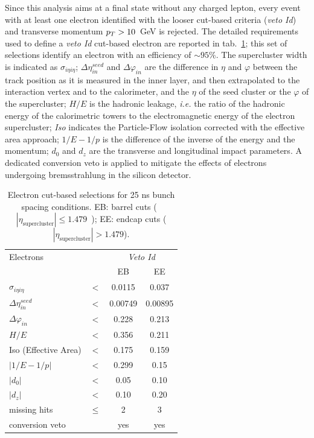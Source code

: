 \noindent Since this analysis aims at a final state without any charged lepton, every event with at least one electron identified with the looser cut-based criteria (\emph{veto Id}) and transverse momentum $p_T > 10$~GeV is rejected. The detailed requirements used to define a \emph{veto Id} cut-based electron are reported in tab.~\ref{tab:EGcutBar}; this set of selections identify an electron with an efficiency of $\sim 95$\%. The supercluster width is indicated as $\sigma_{i\eta i\eta}$; $\Delta \eta_{in}^{seed}$ and $\Delta \varphi_{in}$ are the difference in $\eta$ and $\varphi$ between the track position as it is measured in the inner layer, and then extrapolated to the interaction vertex and to the calorimeter, and the $\eta$ of the seed cluster or the $\varphi$ of the supercluster; $H/E$ is the hadronic leakage, \textit{i.e.} the ratio of the hadronic energy of the calorimetric towers to the electromagnetic energy of the electron supercluster; \emph{Iso} indicates the Particle-Flow isolation corrected with the effective area approach; $1/E - 1/p$ is the difference of the inverse of the energy and the momentum; $d_0$ and $d_z$ are the transverse and longitudinal impact parameters. A dedicated conversion veto is applied to mitigate the effects of electrons undergoing bremsstrahlung in the silicon detector.

\begin{table}[htb]
 \centering
\caption{Electron cut-based selections for 25 ns bunch spacing conditions. EB: barrel cuts (~$|\eta_\text{supercluster}| \leq 1.479$~); EE: endcap cuts ( $|\eta_\text{supercluster}| > 1.479$).}
    \begin{tabular}{l|ccc}
    Electrons                   &        & \multicolumn{2}{c}{\emph{Veto Id}}\\
                                &        & EB      & EE     \\
 \hline
 \hline
    $\sigma_{i\eta i\eta} $     & $ < $  &0.0115   &0.037  \\
    $\Delta \eta_{in}^{seed}$   & $ < $  &0.00749  &0.00895 \\
    $\Delta \varphi_{in} $      & $ < $  &0.228    &0.213   \\
    $H/E $                      & $ < $  &0.356    &0.211   \\
    Iso (Effective Area)                 & $<$    &0.175    &0.159   \\
    $|1/E - 1/p|$               & $ < $  &0.299    &0.15    \\
    $|d_0|$                     & $ < $  &0.05     &0.10   \\
    $|d_z|$                     & $ < $  &0.10     &0.20   \\
    missing hits                & $\leq$ &2        &3       \\
    conversion veto             &        &  yes    &yes     \\
    
\end{tabular}

\label{tab:EGcutBar}
\end{table}

